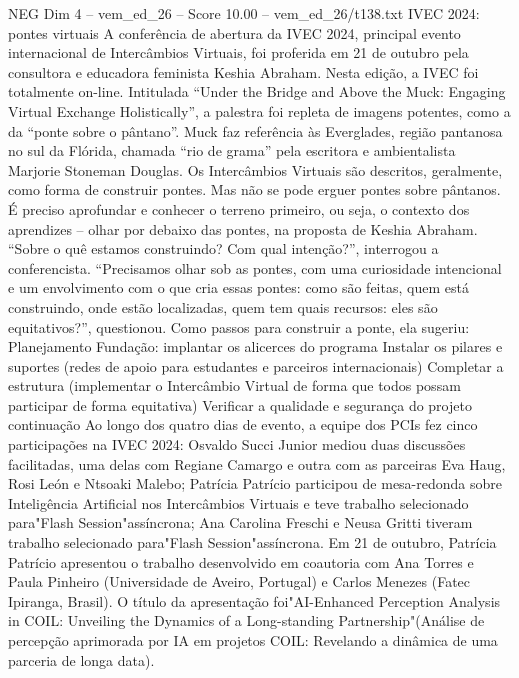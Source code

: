 \begin{textsample}{NEG Dim 4 – vem\_ed\_26 – Score 10.00 – vem\_ed\_26/t138.txt}  \label{ex:f4_neg_159}
IVEC 2024: pontes virtuais A conferência de abertura da IVEC 2024, principal evento internacional de Intercâmbios Virtuais, foi proferida em 21 de outubro pela consultora e educadora feminista Keshia Abraham.
Nesta edição, a IVEC foi totalmente on-line.
Intitulada “Under the Bridge and Above the Muck: Engaging Virtual Exchange Holistically”, a palestra foi repleta de imagens potentes, como a da “ponte sobre o pântano”.
Muck faz referência às Everglades, região pantanosa no sul da Flórida, chamada “rio de grama” pela escritora e ambientalista Marjorie Stoneman Douglas.
Os Intercâmbios Virtuais são descritos, geralmente, como forma de construir pontes.
Mas não se pode erguer pontes sobre pântanos.
É preciso aprofundar e conhecer o terreno primeiro, ou seja, o contexto dos aprendizes – olhar por debaixo das pontes, na proposta de Keshia Abraham. “Sobre o quê estamos construindo?
Com qual intenção?”, interrogou a conferencista. “Precisamos olhar sob as pontes, com uma curiosidade intencional e um envolvimento com o que cria essas pontes: como são feitas, quem está construindo, onde estão localizadas, quem tem quais recursos: eles são equitativos?”, questionou.
Como passos para construir a ponte, ela sugeriu: Planejamento Fundação: implantar os alicerces do programa Instalar os pilares e suportes (redes de apoio para estudantes e parceiros internacionais) Completar a estrutura (implementar o Intercâmbio Virtual de forma que todos possam participar de forma equitativa) Verificar a qualidade e segurança do projeto continuação Ao longo dos quatro dias de evento, a equipe dos PCIs fez cinco participações na IVEC 2024: Osvaldo Succi Junior mediou duas discussões facilitadas, uma delas com Regiane Camargo e outra com as parceiras Eva Haug, Rosi León e Ntsoaki Malebo; Patrícia Patrício participou de mesa-redonda sobre Inteligência Artificial nos Intercâmbios Virtuais e teve trabalho selecionado para"Flash Session"assíncrona; Ana Carolina Freschi e Neusa Gritti tiveram trabalho selecionado para"Flash Session"assíncrona.
Em 21 de outubro, Patrícia Patrício apresentou o trabalho desenvolvido em coautoria com Ana Torres e Paula Pinheiro (Universidade de Aveiro, Portugal) e Carlos Menezes (Fatec Ipiranga, Brasil).
O título da apresentação foi"AI-Enhanced Perception Analysis in COIL: Unveiling the Dynamics of a Long-standing Partnership"(Análise de percepção aprimorada por IA em projetos COIL: Revelando a dinâmica de uma parceria de longa data).

\end{textsample}
